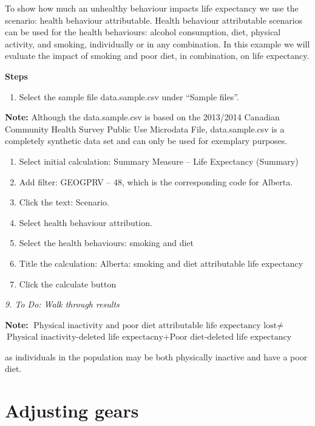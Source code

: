 \documentclass[]{book}
\providecommand{\tightlist}{%
  \setlength{\itemsep}{0pt}\setlength{\parskip}{0pt}}
\begin{document}
To show how much an unhealthy behaviour impacts life expectancy we use the scenario: health behaviour attributable. Health behaviour attributable scenarios can be used for the health behaviours: alcohol consumption, diet, physical activity, and smoking, individually or in any combination. In this example we will evaluate the impact of smoking and poor diet, in combination, on life expectancy.

\textbf{Steps}

\begin{enumerate}
\def\labelenumi{\arabic{enumi}.}
\tightlist
\item
  Select the sample file data.sample.csv under ``Sample files''.
\end{enumerate}

\textbf{Note:} Although the data.sample.csv is based on the 2013/2014 Canadian Community Health Survey Public Use Microdata File, data.sample.csv is a completely synthetic data set and can only be used for exemplary purposes.

\begin{enumerate}
\def\labelenumi{\arabic{enumi}.}
\setcounter{enumi}{1}
\item
  Select initial calculation: Summary Measure -- Life Expectancy (Summary)
\item
  Add filter: GEOGPRV -- 48, which is the corresponding code for Alberta.
\item
  Click the text: Scenario.
\item
  Select health behaviour attribution.
\item
  Select the health behaviours: smoking and diet
\item
  Title the calculation: Alberta: smoking and diet attributable life expectancy
\item
  Click the calculate button
\end{enumerate}

\emph{9. To Do: Walk through results}

\textbf{Note:} \(\text{Physical inactivity and poor diet attributable life expectancy lost} \neq\)
\(\text{Physical inactivity-deleted life expectacny} + \text{Poor diet-deleted life expectancy}\)

as individuals in the population may be both physically inactive and have a poor diet.

\hypertarget{adjusting-gears}{%
\section{Adjusting gears}\label{adjusting-gears}}
\end{document}
